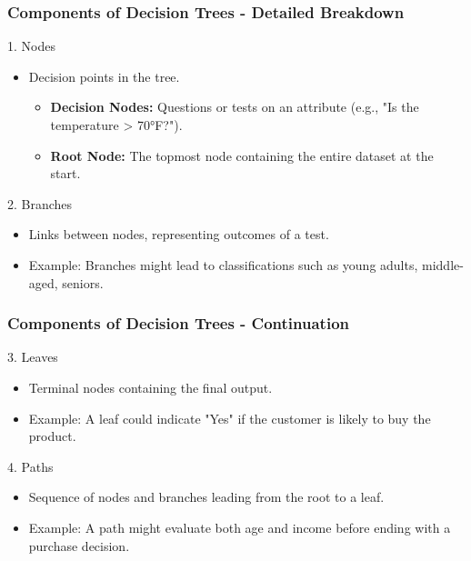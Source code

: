 \documentclass[aspectratio=169]{beamer}
\begin{document}
\begin{frame}[fragile]
  \frametitle{Components of Decision Trees - Detailed Breakdown}
  
  \begin{block}{1. Nodes}
    \begin{itemize}
      \item Decision points in the tree.
      \begin{itemize}
        \item \textbf{Decision Nodes:} Questions or tests on an attribute (e.g., "Is the temperature > 70°F?").
        \item \textbf{Root Node:} The topmost node containing the entire dataset at the start.
      \end{itemize}
    \end{itemize}
  \end{block}

  \begin{block}{2. Branches}
    \begin{itemize}
      \item Links between nodes, representing outcomes of a test.
      \item Example: Branches might lead to classifications such as young adults, middle-aged, seniors.
    \end{itemize}
  \end{block}
\end{frame}

\begin{frame}[fragile]
  \frametitle{Components of Decision Trees - Continuation}

  \begin{block}{3. Leaves}
    \begin{itemize}
      \item Terminal nodes containing the final output.
      \item Example: A leaf could indicate "Yes" if the customer is likely to buy the product.
    \end{itemize}
  \end{block}

  \begin{block}{4. Paths}
    \begin{itemize}
      \item Sequence of nodes and branches leading from the root to a leaf.
      \item Example: A path might evaluate both age and income before ending with a purchase decision.
    \end{itemize}
  \end{block}
\end{frame}
\end{document}
